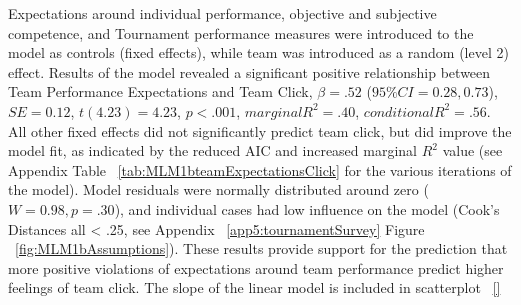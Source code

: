 Expectations around individual performance, objective and subjective competence, and Tournament performance measures were introduced to the model as controls (fixed effects), while team was introduced as a random (level 2) effect.  Results of the model revealed a significant positive relationship between Team Performance Expectations and Team Click, $\beta = .52$ ($95\% CI =  0.28, 0.73$), $SE = 0.12$, $t(4.23) = 4.23$, $p < .001$, $marginal R^2 = .40$, $conditional R^2 = .56$.  All other fixed effects did not significantly predict team click, but did improve the model fit, as indicated by the reduced AIC and increased marginal $R^2$ value (see Appendix Table ~\ref{tab:MLM1bteamExpectationsClick} for the various iterations of the model).   Model residuals were normally distributed around zero ($W = 0.98, p = .30$), and individual cases had low influence on the model (Cook's Distances all < .25, see Appendix ~\ref{app5:tournamentSurvey} Figure ~\ref{fig:MLM1bAssumptions}).  These results provide support for the prediction that more positive violations of expectations around team performance predict higher feelings of team click.  The slope of the linear model is included in scatterplot ~\ref{}


  

